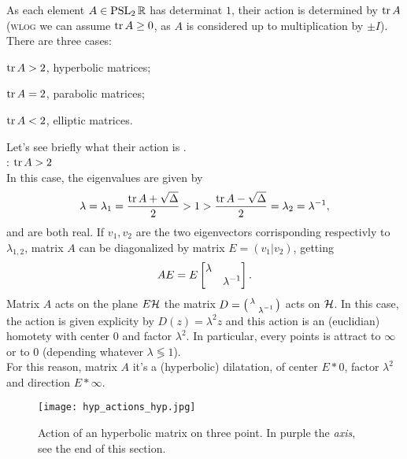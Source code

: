 \label{subsec:hyp_isom}

As each element $A\in\operatorname{PSL}_{2}\mathbb{R}$ has determinat $1$, their action is determined by $\operatorname{tr} A$ (\textsc{wlog} we can assume $\operatorname{tr} A\geq0$, as $A$ is considered up to multiplication by $\pm I$). There are three cases:
\begin{compactitem}
\item $\operatorname{tr} A>2$, hyperbolic matrices;
\item $\operatorname{tr} A=2$, parabolic matrices;
\item $\operatorname{tr} A<2$, elliptic matrices.
\end{compactitem} 

Let's see briefly what their action is .\\[2mm]
: $\operatorname{tr} A>2$\\
In this case, the eigenvalues are given by
\[
\lambda=\lambda_{1}=\frac{\operatorname{tr} A+\sqrt{\Delta}}{2}>1>\frac{\operatorname{tr} A-\sqrt{\Delta}}{2}=\lambda_{2}=\lambda^{-1},
\]
and are both real. If $v_{1},v_{2}$ are the two eigenvectors corrisponding respectivly to $\lambda_{1,2}$, matrix $A$ can be diagonalized by matrix $E=(v_{1}|v_{2})$, getting
\[
AE=E\begin{bmatrix} \lambda&\\&\lambda^{-1} \end{bmatrix}.
\]
Matrix $A$ acts on the plane $E\mathcal{H}$  the matrix $D=\left(\begin{smallmatrix} \lambda&\\&\lambda^{-1} \end{smallmatrix}\right)$ acts on $\mathcal{H}$. In this case, the action is given explicity by $D(z)=\lambda^{2}z$ and this action is an (euclidian) homotety with center $0$ and factor $\lambda^{2}$. In particular, every points is attract to $\infty$ or to $0$ (depending whatever $\lambda\lessgtr1$).\\
For this reason, matrix $A$ it's a (hyperbolic) dilatation, of center $E\ast0$, factor $\lambda^{2}$ and direction $E\ast\infty$.%

\begin{figure}[H]
\centering
\texttt{[image: hyp\_actions\_hyp.jpg]}
  \noindent\\
  \decoRule
  \caption{Action of an hyperbolic matrix on three point. In purple the \emph{axis}, see the end of this section.}
  \label{fig:hyp_action_hyp}
\end{figure}

